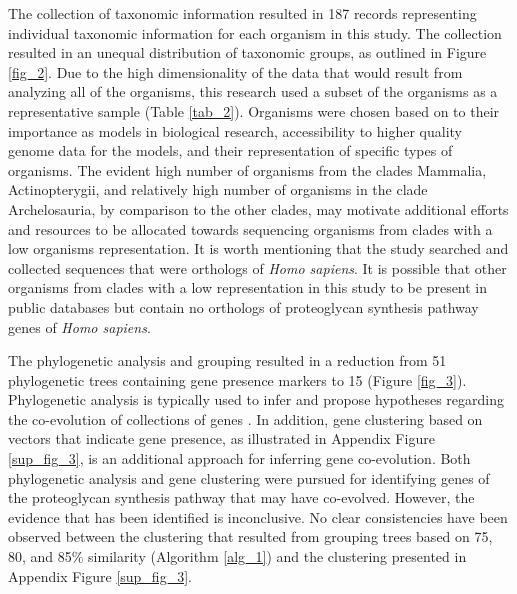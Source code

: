\documentclass{article}
\begin{document}
The collection of taxonomic information resulted in 187 records representing individual taxonomic information for each organism in this study. The collection resulted in an unequal distribution of taxonomic groups, as outlined in Figure \ref{fig_2}. Due to the high dimensionality of the data that would result from analyzing all of the organisms, this research used a subset of the organisms as a representative sample (Table \ref{tab_2}). Organisms were chosen based on to their importance as models in biological research, accessibility to higher quality genome data for the models, and their representation of specific types of organisms. The evident high number of organisms from the clades Mammalia, Actinopterygii, and relatively high number of organisms in the clade Archelosauria, by comparison to the other clades, may motivate additional efforts and resources to be allocated towards sequencing organisms from clades with a low organisms representation. It is worth mentioning that the study searched and collected sequences that were orthologs of \textit{Homo sapiens}. It is possible that other organisms from clades with a low representation in this study to be present in public databases but contain no orthologs of proteoglycan synthesis pathway genes of \textit{Homo sapiens}. 

The phylogenetic analysis and grouping resulted in a reduction from 51 phylogenetic trees containing gene presence markers to 15 (Figure \ref{fig_3}). Phylogenetic analysis is typically used to infer and propose hypotheses regarding the co-evolution of collections of genes \cite{protein_protein}. In addition, gene clustering based on vectors that indicate gene presence, as illustrated in Appendix Figure \ref{sup_fig_3}, is an additional approach for inferring gene co-evolution. Both phylogenetic analysis and gene clustering were pursued for identifying genes of the proteoglycan synthesis pathway that may have co-evolved. However, the evidence that has been identified is inconclusive. No clear consistencies have been observed between the clustering that resulted from grouping trees based on 75, 80, and 85\% similarity (Algorithm \ref{alg_1}) and the clustering presented in Appendix Figure \ref{sup_fig_3}. 
\end{document}
